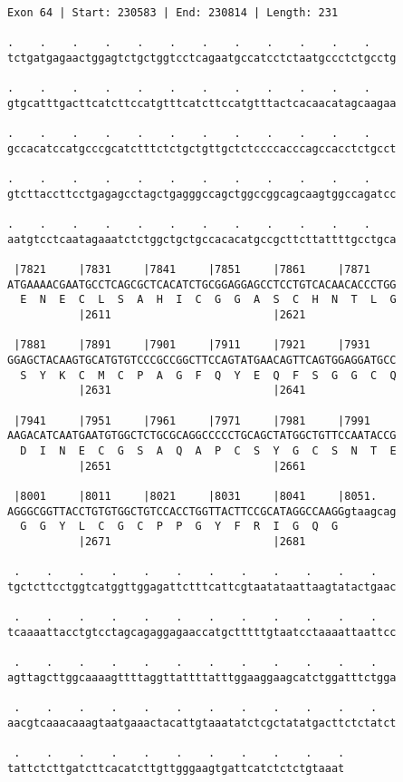 \documentclass{article}
\begin{document}
\begin{Verbatim}
Exon 64 | Start: 230583 | End: 230814 | Length: 231
 
.    .    .    .    .    .    .    .    .    .    .    .    
tctgatgagaactggagtctgctggtcctcagaatgccatcctctaatgccctctgcctg
  
.    .    .    .    .    .    .    .    .    .    .    .    
gtgcatttgacttcatcttccatgtttcatcttccatgtttactcacaacatagcaagaa
  
.    .    .    .    .    .    .    .    .    .    .    .    
gccacatccatgcccgcatctttctctgctgttgctctccccacccagccacctctgcct
  
.    .    .    .    .    .    .    .    .    .    .    .    
gtcttaccttcctgagagcctagctgagggccagctggccggcagcaagtggccagatcc
  
.    .    .    .    .    .    .    .    .    .    .    .    
aatgtcctcaatagaaatctctggctgctgccacacatgccgcttcttattttgcctgca
  
 |7821     |7831     |7841     |7851     |7861     |7871    
ATGAAAACGAATGCCTCAGCGCTCACATCTGCGGAGGAGCCTCCTGTCACAACACCCTGG
  E  N  E  C  L  S  A  H  I  C  G  G  A  S  C  H  N  T  L  G
           |2611                         |2621              
  
 |7881     |7891     |7901     |7911     |7921     |7931    
GGAGCTACAAGTGCATGTGTCCCGCCGGCTTCCAGTATGAACAGTTCAGTGGAGGATGCC
  S  Y  K  C  M  C  P  A  G  F  Q  Y  E  Q  F  S  G  G  C  Q
           |2631                         |2641              
  
 |7941     |7951     |7961     |7971     |7981     |7991    
AAGACATCAATGAATGTGGCTCTGCGCAGGCCCCCTGCAGCTATGGCTGTTCCAATACCG
  D  I  N  E  C  G  S  A  Q  A  P  C  S  Y  G  C  S  N  T  E
           |2651                         |2661              
  
 |8001     |8011     |8021     |8031     |8041     |8051.   
AGGGCGGTTACCTGTGTGGCTGTCCACCTGGTTACTTCCGCATAGGCCAAGGgtaagcag
  G  G  Y  L  C  G  C  P  P  G  Y  F  R  I  G  Q  G         
           |2671                         |2681              
  
 .    .    .    .    .    .    .    .    .    .    .    .   
tgctcttcctggtcatggttggagattctttcattcgtaatataattaagtatactgaac
  
 .    .    .    .    .    .    .    .    .    .    .    .   
tcaaaattacctgtcctagcagaggagaaccatgctttttgtaatcctaaaattaattcc
  
 .    .    .    .    .    .    .    .    .    .    .    .   
agttagcttggcaaaagttttaggttattttatttggaaggaagcatctggatttctgga
  
 .    .    .    .    .    .    .    .    .    .    .    .   
aacgtcaaacaaagtaatgaaactacattgtaaatatctcgctatatgacttctctatct
  
 .    .    .    .    .    .    .    .    .    .    .
tattctcttgatcttcacatcttgttgggaagtgattcatctctctgtaaat
\end{Verbatim}
\end{document}
